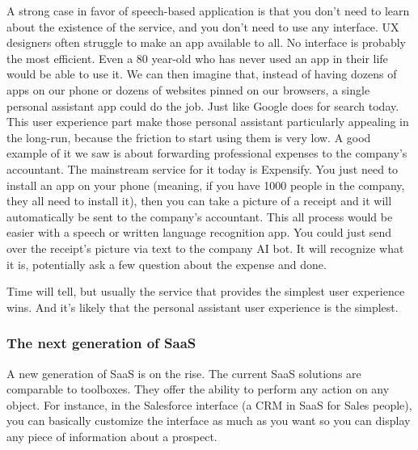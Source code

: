 \documentclass[12pt]{article}
\begin{document}
A strong case in favor of speech-based application is that you don't need to
learn about the existence of the service, and you don't need to use any
interface. UX designers often struggle to make an app available to all. No
interface is probably the most efficient. Even a 80 year-old who has never used
an app in their life would be able to use it. We can then imagine that, instead
of having dozens of apps on our phone or dozens of websites pinned on our
browsers, a single personal assistant app could do the job. Just like Google
does for search today. This user experience part make those personal assistant
particularly appealing in the long-run, because the friction to start using them
is very low. A good example of it we saw is about forwarding professional
expenses to the company's accountant. The mainstream service for it today is
Expensify. You just need to install an app on your phone (meaning, if you have
1000 people in the company, they all need to install it), then you can take a
picture of a receipt and it will automatically be sent to the company's
accountant. This all process would be easier with a speech or written language
recognition app. You could just send over the receipt's picture via text to the
company AI bot. It will recognize what it is, potentially ask a few question
about the expense and done.

Time will tell, but usually the service that provides the simplest user
experience wins. And it's likely that the personal assistant user experience is
the simplest.


\subsubsection{The next generation of SaaS}

A new generation of SaaS is on the rise. The current SaaS solutions are
comparable to toolboxes. They offer the ability to perform any action on any
object. For instance, in the Salesforce interface (a CRM in SaaS for Sales
people), you can basically customize the interface as much as you want so you
can display any piece of information about a prospect.


\smallskip
\end{document}
